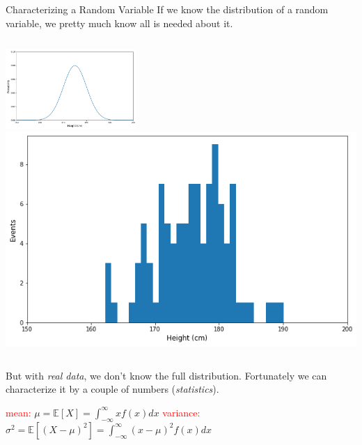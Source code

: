 \documentclass{beamer}
\begin{document}
\begin{frame}{Characterizing a Random Variable}
	If we know the distribution of a random variable, we pretty much know all is needed about it. 
	\newline
	\begin{columns}
		\includegraphics[height=3cm]{continouos_random_variable}
		\pause
		\includegraphics[height=3 cm]{real_data}
	\end{columns}
	\vspace{0.5cm}
        
	But with \textit{real data}, we don't know the full distribution. Fortunately we can characterize it by a couple of numbers (\emph{statistics}).
	\pause
	\small{
		\begin{center}
			\textcolor{red}{mean:} $\boxed{\mu = \mathbb{E}[X] = \int_{-\infty}^{\infty} xf(x)dx}$\quad
			\textcolor{red}{variance:}  
			$\boxed{\sigma^2 = \mathbb{E}[(X-\mu)^2] =\int_{-\infty}^{\infty} (x-\mu)^2f(x)dx}$
	\end{center}
}
\end{frame}
\end{document}
